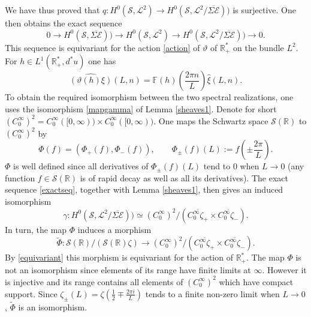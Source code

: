 \documentclass{pspum-l}
\theoremstyle{definition}
\theoremstyle{remark}
\numberwithin{equation}{section}
\def\F{{\mathbb F}}
\def\R{{\mathbb R}}
\def\cE{{\mathcal E}}
\def\cL{{\mathcal L}}
\def\cS{{\mathcal S}}
\def\rep{\vartheta}
\def\fourier{\F}
\def\scal2{{\mathscr S}}
\begin{document}
  We have thus proved that $q:H^0(\scal2,\cL^2)\to H^0(\scal2,\cL^2/\overline{\Sigma\cE}))$ is surjective. One then obtains the exact sequence 
\begin{equation}\label{exactseq}
  0\to H^0(\scal2,\overline{\Sigma\cE}))\to H^0(\scal2,\cL^2)\to H^0(\scal2,\cL^2/\overline{\Sigma\cE}))\to 0.
  \end{equation}
 This sequence is equivariant for the action \eqref{action} of $\rep$ of $\R_+^*$ on the bundle $L^2$. 
 For $h\in L^1(\R_+^*,d^*u)$ one has 
\begin{equation}\label{equivariant}
  \widehat {(\rep(h)\xi)}(L,n)=\fourier(h)\left(\frac{2\pi  n}{L}\right) \widehat \xi(L,n).
 \end{equation}
To obtain the required isomorphism between the two spectral realizations, one uses  the isomorphism \eqref{mapgamma} of Lemma \ref{sheaves1}. Denote for short $(C_0^{\infty})^2=C_0^{\infty}([0,\infty))\times C_0^{\infty}([0,\infty))$.
 One maps the Schwartz space $\cS(\R)$ to $(C_0^{\infty})^2$ by 
 \begin{equation*}\label{mapschwartz}
  \Phi(f)=(\Phi_+(f),\Phi_-(f)), \qquad \Phi_\pm(f)(L):=f\left(\pm \frac{2\pi}{L}\right).
    \end{equation*}
   $ \Phi$ is well defined since  all derivatives of $\Phi_\pm(f)(L)$ tend to $0$ when $L\to 0$ (any function $f\in\cS(\R)$ is of rapid decay as well as all its derivatives). 
 The exact sequence \eqref{exactseq}, together with Lemma \ref{sheaves1}, then gives an induced isomorphism  
 \begin{equation*}\label{mapgamma1}
 \gamma: H^0(\scal2,\cL^2/\overline{\Sigma\cE}))\simeq (C_0^{\infty})^2/ \left(\overline{C_0^{\infty}\zeta_+}\times \overline{C_0^{\infty}\zeta_-}\right).
    \end{equation*}
 In turn, the map $ \Phi$ induces a morphism 
  \begin{equation*}\label{mapPhi}
 \tilde \Phi:\cS(\R)/(\cS(\R)\zeta) \to (C_0^{\infty})^2/ \left(\overline{C_0^{\infty}\zeta_+}\times \overline{C_0^{\infty}\zeta_-}\right).
  \end{equation*}
  By \eqref{equivariant}  this morphism is equivariant for the action of $\R_+^*$. The map $ \Phi$ is not an isomorphism since elements of its range have finite limits at $\infty$. However it is injective and its range contains all elements of  $(C_0^{\infty})^2$ which have compact support.  Since $\zeta_\pm(L)=\zeta\left(\frac 12\mp\frac{2\pi i }{L}\right)$ tends to a finite non-zero limit when $L\to 0$,   $\tilde \Phi$ is an isomorphism.\endproof 
 
\end{document}
